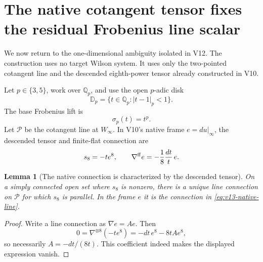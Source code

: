 \documentclass[11pt]{article}
\newtheorem{lemma}[lemma]{Lemma}
\theoremstyle{definition}
\theoremstyle{remark}
\begin{document}
\section{The native cotangent tensor fixes the residual Frobenius line scalar}
\label{sec:v13-line-frobenius}

We now return to the one-dimensional ambiguity isolated in V12.  The
construction uses no target Wilson system.  It uses only the two-pointed
cotangent line and the descended eighth-power tensor already constructed in
V10.

Let $p\in\{3,5\}$, work over $\mathbb Q_p$, and use the open $p$-adic disk
\[
 \mathbb D_p=\{t\in\mathbb Q_p:|t-1|_p<1\}.
\]
The base Frobenius lift is
\begin{equation}
 \sigma_p(t)=t^p.
 \label{eq:v13-base-frobenius}
\end{equation}
Let $\mathscr P$ be the cotangent line at $W_\infty$.  In V10's native frame
$e=du|_\infty$, the descended tensor and finite-flat connection are
\begin{equation}
 s_8=-t e^8,
 \qquad
 \nabla^{\rm ff}e=-\frac18\frac{dt}{t}\,e.
 \label{eq:v13-native-line}
\end{equation}

\begin{lemma}[The native connection is characterized by the descended tensor]
\label{lem:v13-native-connection}
On a simply connected open set where $s_8$ is nonzero, there is a unique line
connection on $\mathscr P$ for which $s_8$ is parallel.  In the frame $e$ it
is the connection in \cref{eq:v13-native-line}.
\end{lemma}

\begin{proof}
Write a line connection as $\nabla e=Ae$.  Then
\[
 0=\nabla^{\otimes8}(-t e^8)
 =-dt\,e^8-8t A e^8,
\]
so necessarily $A=-dt/(8t)$.  This coefficient indeed makes the displayed
expression vanish.
\end{proof}
\end{document}

